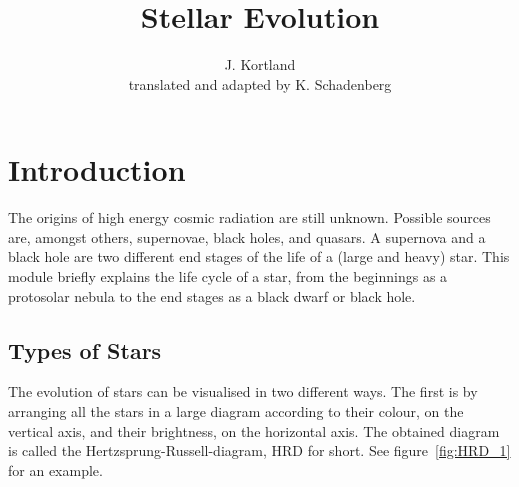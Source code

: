 \documentclass[12pt,a4paper]{article}
\author{J. Kortland \\ translated and adapted by K. Schadenberg}
\date{}
\title{Stellar Evolution}
\numberwithin{equation}{section}
\numberwithin{figure}{section}
\numberwithin{table}{section}
\begin{document}
\maketitle

\section{Introduction}
The origins of high energy cosmic radiation are still unknown. Possible sources are, amongst others, supernovae, black holes, and quasars. A supernova and a black hole are two different end stages of the life of a (large and heavy) star. This module briefly explains the life cycle of a star, from the beginnings as a protosolar nebula to the end stages as a black dwarf or black hole.

\subsection{Types of Stars}
The evolution of stars can be visualised in two different ways. The first is by arranging all the stars in a large diagram according to their colour, on the vertical axis, and their brightness, on the horizontal axis. The obtained diagram is called the Hertzsprung-Russell-diagram, HRD for short. See figure~\ref{fig:HRD_1} for an example.
\end{document}
